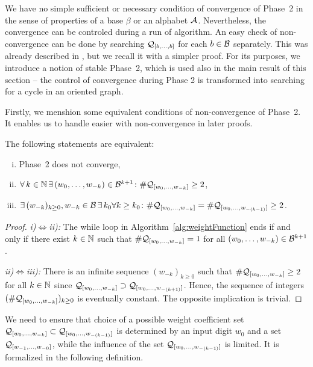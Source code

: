 We have no simple sufficient or necessary condition of convergence of Phase~2 in the sense of properties of a base $\beta$ or an alphabet $\mathcal{A}$. Nevertheless, the convergence can be controled during a run of algorithm. An easy check of non-convergence can be done by searching $\mathcal{Q}_{[b, \dots, b]}$ for each $b\in\mathcal{B}$ separately. This was already described in \cite{vu}, but we recall it with a simpler proof. For its purposes, we introduce a notion of stable Phase~2, which is used also in the main result of this section -- the control of convergence during Phase 2 is transformed into searching for a cycle in an oriented graph.

Firstly, we menshion some equivalent conditions of non-convergence of Phase~2. It enables us to handle easier with non-convergence in later  proofs.
\begin{lem}
\label{lem:equivalentStatementsForNonConvergenePhaseTwo}
The following statements are equivalent:
\begin{enumerate}[i)]
	\item Phase~2 does not converge,
	\item $\forall \,k\in \mathbb{N} \,\exists\, (w_{0}, \dots, w_{-k})\in\mathcal{B}^{k+1} \colon \#\mathcal{Q}_{[w_{0}, \dots, w_{-k}]}\geq 2$,
	\item $\exists \,(w_{-k})_{k\geq 0}, w_{-k}\in\mathcal{B} \,\exists\, k_0\forall k\geq k_0 \colon \#\mathcal{Q}_{[w_{0}, \dots, w_{-k}]}=\#\mathcal{Q}_{[w_{0}, \dots, w_{-(k-1)}]}\geq 2$.
\end{enumerate}
\end{lem}
\begin{proof}
\textit{i)}$\iff$\textit{ii):} The while loop in Algorithm~\ref{alg:weightFunction} ends if and only if there exist $k\in\mathbb{N}$ such that $\#\mathcal{Q}_{[w_{0}, \dots, w_{-k}]}=1$ for all $(w_{0}, \dots, w_{-k})\in\mathcal{B}^{k+1}$.

\textit{ii)}$\iff$\textit{iii):} There is an infinite sequence $(w_{-k})_{k\geq 0}$ such that $\#\mathcal{Q}_{[w_{0}, \dots, w_{-k}]}\geq 2$ for all $k\in\mathbb{N}$ since $\mathcal{Q}_{[w_{0}, \dots, w_{-k}]}\supset\mathcal{Q}_{[w_{0}, \dots, w_{-(k+1)}]}$. Hence, the sequence of integers $(\#\mathcal{Q}_{[w_{0}, \dots, w_{-k}]})_{k\geq 0}$ is eventually constant. The opposite implication is trivial.
\end{proof}

We need to ensure that choice of a possible weight coefficient set $\mathcal{Q}_{[w_{0}, \dots, w_{-k}]}\subset \mathcal{Q}_{[w_{0}, \dots, w_{-(k-1)}]}$ is determined by an input digit $w_0$ and a set $\mathcal{Q}_{[w_{-1}, \dots, w_{-0}]}$, while the influence of the set $\mathcal{Q}_{[w_{0}, \dots, w_{-(k-1)}]}$ is limited. It is formalized in the following definition.

